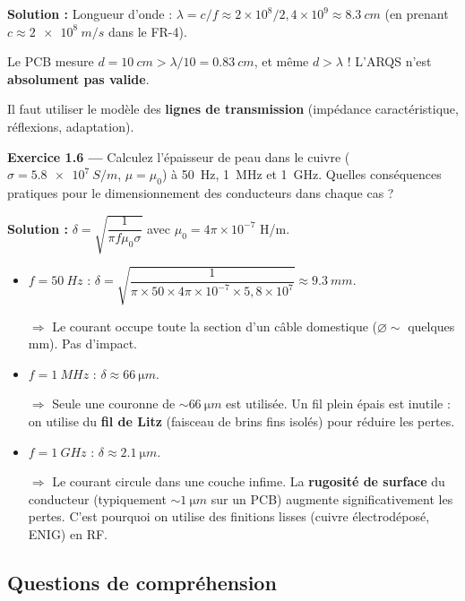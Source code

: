 \documentclass[12pt,a4paper,twoside]{book}
\begin{document}
\begin{pratique}
\textbf{Solution :} Longueur d'onde : $\lambda = c/f \approx 2\times10^8 / 2{,}4\times10^9 \approx \SI{8.3}{cm}$ (en prenant $c \approx \SI{2e8}{m/s}$ dans le FR-4).

Le PCB mesure $d = \SI{10}{cm} > \lambda/10 = \SI{0.83}{cm}$, et même $d > \lambda$ ! L'ARQS n'est \textbf{absolument pas valide}.

Il faut utiliser le modèle des \textbf{lignes de transmission} (impédance caractéristique, réflexions, adaptation).
\end{pratique}

\textbf{Exercice 1.6 —} Calculez l'épaisseur de peau dans le cuivre ($\sigma = \SI{5.8e7}{S/m}$, $\mu = \mu_0$) à \SI{50}{Hz}, \SI{1}{MHz} et \SI{1}{GHz}. Quelles conséquences pratiques pour le dimensionnement des conducteurs dans chaque cas ?

\begin{pratique}
\textbf{Solution :} $\delta = \sqrt{\dfrac{1}{\pi f \mu_0 \sigma}}$ avec $\mu_0 = 4\pi\times10^{-7}$ H/m.

\begin{itemize}[nosep]
\item $f = \SI{50}{Hz}$ : $\delta = \sqrt{\dfrac{1}{\pi \times 50 \times 4\pi\times10^{-7} \times 5{,}8\times10^7}} \approx \SI{9.3}{mm}$.

$\Rightarrow$ Le courant occupe toute la section d'un câble domestique ($\varnothing \sim$ quelques mm). Pas d'impact.

\item $f = \SI{1}{MHz}$ : $\delta \approx \SI{66}{\micro m}$.

$\Rightarrow$ Seule une couronne de $\sim\SI{66}{\micro m}$ est utilisée. Un fil plein épais est inutile : on utilise du \textbf{fil de Litz} (faisceau de brins fins isolés) pour réduire les pertes.

\item $f = \SI{1}{GHz}$ : $\delta \approx \SI{2.1}{\micro m}$.

$\Rightarrow$ Le courant circule dans une couche infime. La \textbf{rugosité de surface} du conducteur (typiquement $\sim\SI{1}{\micro m}$ sur un PCB) augmente significativement les pertes. C'est pourquoi on utilise des finitions lisses (cuivre électrodéposé, ENIG) en RF.
\end{itemize}
\end{pratique}

\subsection*{Questions de compréhension}
\end{document}
